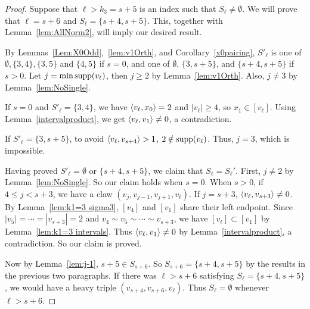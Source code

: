 \begin{proof}
Suppose that $\ell>k_3=s+5$ is an index such that $S_{\ell}\ne\emptyset$. We will prove that $\ell=s+6$ and $S_{\ell}=\{s+4,s+5\}$. This, together with Lemma~\ref{lem:AllNorm2}, will imply our desired result.

By Lemmas~\ref{Lem:X0Odd},~\ref{lem:v1Orth}, and Corollary~\ref{x0pairing},  $S'_{\ell}$ is one of $\emptyset,\{3,4\},\{3,5\}$ and $\{4,5\}$ if $s=0$, and
one of $\emptyset$, $\{ 3, s+5\}$, and $\{s+4,s+5\}$ if $s>0$. Let $j=\min\operatorname{supp}(v_{\ell})$, then $j\ge2$ by Lemma~\ref{lem:v1Orth}.  Also, $j \ne 3$ by Lemma~\ref{lem:NoSingle}.

If $s=0$ and $S'_{\ell}=\{3,4\}$, we have $\left\langle v_{\ell} , x_0 \right\rangle=2$ and $|v_{\ell}|\ge4$, so $x_1\in[v_{\ell}]$. Using Lemma~\ref{intervalproduct}, we get $\left\langle v_{\ell} , v_1 \right\rangle\ne0$, a contradiction.

If $S'_{\ell}=\{ 3, s+5\}$, to avoid $\left\langle v_{\ell} , v_{s+4} \right\rangle>1$, $2\notin\operatorname{supp}(v_{\ell})$. Thus, $j=3$, which is impossible.

Having proved $S'_{\ell}=\emptyset$ or $\{s+4, s+5\}$, we claim that $S_{\ell}=S_{\ell}'$. First, $j\ne2$ by Lemma~\ref{lem:NoSingle}. So our claim holds when $s=0$. When $s>0$,
if $4\le j<s+3$, we have a claw $(v_j,v_{j-1},v_{j+1},v_{\ell})$. If $j=s+3$, $\left\langle v_{\ell} , v_{s+3} \right\rangle\neq 0$. By Lemma~\ref{lem:k1=3 sigma3}, $[v_4]$ and $[v_1]$ share their left endpoint. Since $|v_5|=\cdots=|v_{s+3}|=2$ and $v_4\sim v_5 \sim \cdots \sim v_{s+3}$, we have $[v_{\ell}]\subset[v_1]$ by Lemma~\ref{lem:k1=3 intervals}. Thus $\left\langle v_{\ell} , v_1 \right\rangle\ne 0$ by Lemma~\ref{intervalproduct}, a contradiction. So our claim is proved.

Now by Lemma~\ref{lem:j-1}, $s+5\in S_{s+6}$. So $S_{s+6}=\{s+4,s+5\}$ by the results in the previous two paragraphs. If there was $\ell>s+6$ satisfying $S_{\ell}=\{s+4,s+5\}$, we would have a heavy triple $(v_{s+4},v_{s+6},v_{\ell})$. Thus  $S_{\ell}=\emptyset$ whenever $\ell>s+6$.
\end{proof}


